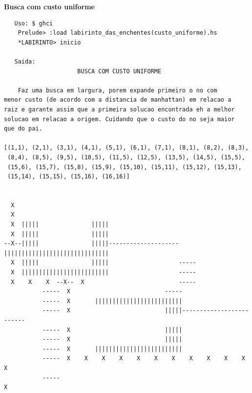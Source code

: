 \documentclass[10pt]{article}
\begin{document}
\textbf{Busca com custo uniforme}
\begin{verbatim}
   Uso: $ ghci
	Prelude> :load labirinto_das_enchentes(custo_uniforme).hs
	*LABIRINTO> inicio

   Saida:
		             BUSCA COM CUSTO UNIFORME

	Faz uma busca em largura, porem expande primeiro o no com
menor custo (de acordo com a distancia de manhattan) em relacao a
raiz e garante assim que a primeira solucao encontrada eh a melhor
solucao em relacao a origem. Cuidando que o custo do no seja maior
que do pai.

[(1,1), (2,1), (3,1), (4,1), (5,1), (6,1), (7,1), (8,1), (8,2), (8,3),
 (8,4), (8,5), (9,5), (10,5), (11,5), (12,5), (13,5), (14,5), (15,5),
 (15,6), (15,7), (15,8), (15,9), (15,10), (15,11), (15,12), (15,13),
 (15,14), (15,15), (15,16), (16,16)]


  X
  X
  X  |||||               |||||
  X  |||||               |||||
--X--|||||               |||||--------------------||||||||||||||||||||||||||||||
  X  |||||               |||||                    -----
  X  |||||||||||||||||||||||||                    -----
  X    X    X  --X--  X                           -----
	       -----  X                           -----
	       -----  X       |||||||||||||||||||||||||
	       -----  X                           |||||-------------------------
	       -----  X                           |||||
	       -----  X                           |||||
	       -----  X       |||||||||||||||||||||||||
	       -----  X    X    X    X    X    X    X    X    X    X    X    X
	       -----                                                         X

\end{verbatim}

\pagebreak
\end{document}
